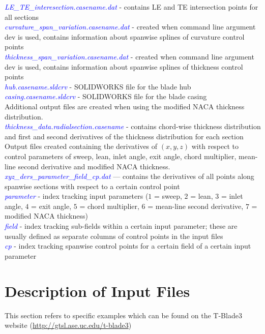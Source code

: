 \documentclass[8pt]{article}
\begin{document}
\textit{\textcolor{blue}{LE\_TE\_interesection.casename.dat}} - contains LE and TE intersection points for all sections\\
\textit{\textcolor{blue}{curvature\_span\_variation.casename.dat}} - created when command line argument {\selectfont dev} is used, contains information about spanwise splines of curvature control points\\
\textit{\textcolor{blue}{thickness\_span\_variation.casename.dat}} - created when command line argument {\selectfont dev} is used, contains information about spanwise splines of thickness control points\\
\textit{\textcolor{blue}{hub.casename.sldcrv}} - SOLIDWORKS file for the blade hub\\
\textit{\textcolor{blue}{casing.casename.sldcrv}} - SOLIDWORKS file for the blade casing\\

\noindent
Additional output files are created when using the modified NACA thickness distribution.\\
\noindent
\textit{\textcolor{blue}{thickness\_data.radialsection.casename}} - contains chord-wise thickness distribution and first and second derivatives of the thickness distribution for each section\\

\noindent
Output files created containing the derivatives of $(x,y,z)$ with respect to control parameters of sweep,
lean, inlet angle, exit angle, chord multiplier, mean-line second derivative and modified NACA thickness.\\
\noindent
\textit{\textcolor{blue}{xyz\_ders\_parameter\_field\_cp.dat}} --- contains the derivatives of all points
along spanwise sections with respect to a certain control point\\
\textit{\textcolor{blue}{parameter}} - index tracking input parameters ($1$ = sweep, $2$ = lean, $3$ = inlet angle, $4$ = exit angle, $5$ = chord multiplier, $6$ = mean-line second derivative, $7$ = modified NACA
thickness)\\
\textit{\textcolor{blue}{field}} - index tracking sub-fields within a certain input parameter; these are
usually defined as separate columns of control points in the input files\\
\textit{\textcolor{blue}{cp}} - index tracking spanwise control points for a certain field of a certain input
parameter

\section{Description of Input Files}
\noindent
This section refers to specific examples which can be found on the T-Blade3 website (\url{http://gtsl.ase.uc.edu/t-blade3})
\end{document}
